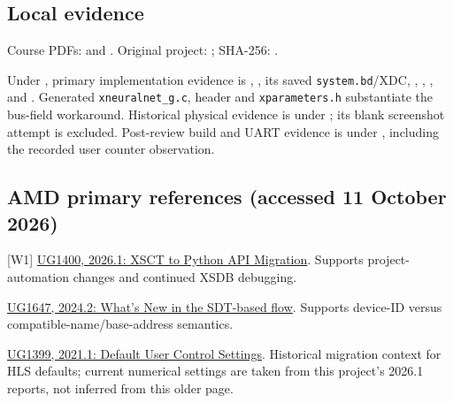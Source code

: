 \documentclass[11pt,a4paper]{article}
\begin{document}
\subsection*{Local evidence}
Course PDFs: 
and .
Original project: ; SHA-256:
{\footnotesize{}}.

Under , primary implementation evidence is
, , its saved
\texttt{system.bd}/XDC, ,
,
, and
. Generated \texttt{xneuralnet\_g.c}, header and
\texttt{xparameters.h} substantiate the bus-field workaround.
Historical physical evidence is under
; its blank screenshot
attempt is excluded. Post-review build and UART evidence is under
, including the recorded user counter observation.

\subsection*{AMD primary references (accessed 11 October 2026)}
\small
[W1] \href{https://docs.amd.com/r/en-US/ug1400-vitis-embedded/XSCT-to-Python-API-Migration}{UG1400, 2026.1: XSCT to Python API Migration}.
Supports project-automation changes and continued XSDB debugging.\par
[W2] \href{https://docs.amd.com/r/2024.2-English/ug1647-porting-embeddedsw-components/What-s-New}{UG1647, 2024.2: What's New in the SDT-based flow}.
Supports device-ID versus compatible-name/base-address semantics.\par
[W3] \href{https://docs.amd.com/r/2021.1-English/ug1399-vitis-hls/Default-User-Control-Settings}{UG1399, 2021.1: Default User Control Settings}.
Historical migration context for HLS defaults; current numerical settings
are taken from this project's 2026.1 reports, not inferred from this older page.
\end{document}
